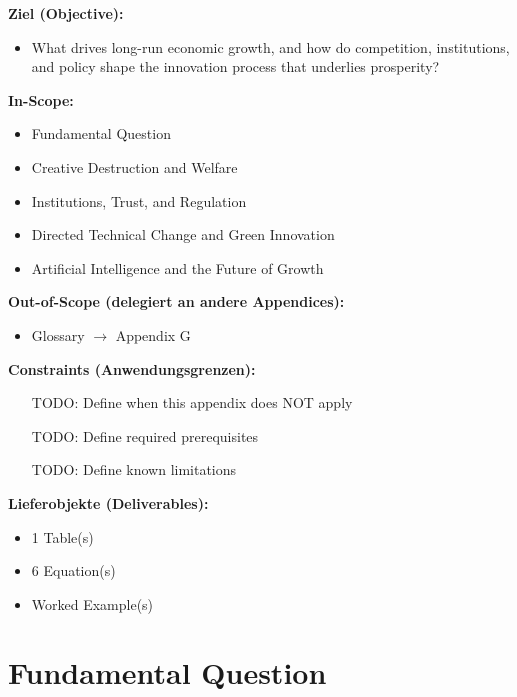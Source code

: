 \begin{tcolorbox}[
    colback=orange!5!white,
    colframe=orange!75!black,
    title={\textbf{Appendix Scope: Ziel / In-Scope / Out-of-Scope / Constraints}},
    fonttitle=\bfseries
]

\textbf{Ziel (Objective):}
\begin{itemize}[nosep]
    \item What drives long-run economic growth, and how do competition, institutions, and policy shape the innovation process that underlies prosperity?
\end{itemize}

\textbf{In-Scope:}
\begin{itemize}[nosep]
    \item Fundamental Question
    \item Creative Destruction and Welfare
    \item Institutions, Trust, and Regulation
    \item Directed Technical Change and Green Innovation
    \item Artificial Intelligence and the Future of Growth
\end{itemize}

\textbf{Out-of-Scope (delegiert an andere Appendices):}
\begin{itemize}[nosep]
    \item Glossary $\rightarrow$ Appendix G
\end{itemize}

\textbf{Constraints (Anwendungsgrenzen):}
\begin{itemize}[nosep]
    \item [TODO: Define when this appendix does NOT apply]
    \item [TODO: Define required prerequisites]
    \item [TODO: Define known limitations]
\end{itemize}

\textbf{Lieferobjekte (Deliverables):}
\begin{itemize}[nosep]
    \item 1 Table(s)
    \item 6 Equation(s)
    \item Worked Example(s)
\end{itemize}

\end{tcolorbox}


\section{Fundamental Question}

